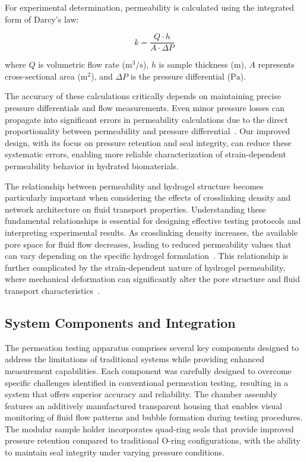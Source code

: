 For experimental determination, permeability is calculated using the integrated form of Darcy's law:

\begin{equation}
    k = \frac{Q \cdot h}{A \cdot \Delta P}
\end{equation}

where $Q$ is volumetric flow rate ($\mathrm{m}^3/\mathrm{s}$), $h$ is sample thickness ($\mathrm{m}$), $A$ represents cross-sectional area ($\mathrm{m}^2$), and $\Delta P$ is the pressure differential ($\mathrm{Pa}$).

The accuracy of these calculations critically depends on maintaining precise pressure differentials and flow measurements. Even minor pressure losses can propagate into significant errors in permeability calculations due to the direct proportionality between permeability and pressure differential~\cite{kleinhans2018hydraulicpermeability}. Our improved design, with its focus on pressure retention and seal integrity, can reduce these systematic errors, enabling more reliable characterization of strain-dependent permeability behavior in hydrated biomaterials.

The relationship between permeability and hydrogel structure becomes particularly important when considering the effects of crosslinking density and network architecture on fluid transport properties. Understanding these fundamental relationships is essential for designing effective testing protocols and interpreting experimental results. As crosslinking density increases, the available pore space for fluid flow decreases, leading to reduced permeability values that can vary depending on the specific hydrogel formulation~\cite{mansour1976permeabilityarticular}. This relationship is further complicated by the strain-dependent nature of hydrogel permeability, where mechanical deformation can significantly alter the pore structure and fluid transport characteristics~\cite{morejon2020compressiveproperties}.

\newpage
\subsection{System Components and Integration}

The permeation testing apparatus comprises several key components designed to address the limitations of traditional systems while providing enhanced measurement capabilities. Each component was carefully designed to overcome specific challenges identified in conventional permeation testing, resulting in a system that offers superior accuracy and reliability. The chamber assembly features an additively manufactured transparent housing that enables visual monitoring of fluid flow patterns and bubble formation during testing procedures. The modular sample holder incorporates quad-ring seals that provide improved pressure retention compared to traditional O-ring configurations, with the ability to maintain seal integrity under varying pressure conditions.

